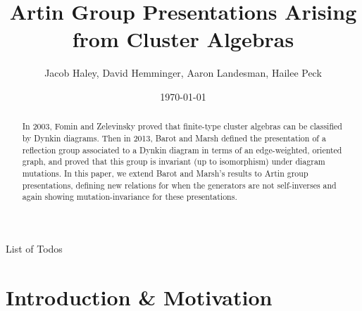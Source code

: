\documentclass[11pt]{amsart}
\makeatletter
\theoremstyle{definition}
\def\listtodoname{List of Todos}
\def\listoftodos{\@starttoc{tdo}\listtodoname}
\makeatother
\begin{document}
\listoftodos




\title{Artin Group Presentations Arising from Cluster Algebras}
\author{Jacob Haley, David Hemminger, Aaron Landesman, Hailee Peck}
\address{you can put addresses for authors\\
here \\
Jacob: 225 St. Edward's Hall; Notre Dame, IN 46556}
\date{\today}

\begin{abstract}
In 2003, Fomin and Zelevinsky proved that finite-type cluster algebras can be classified by Dynkin diagrams. Then in 2013, Barot and Marsh defined the presentation of a reflection group associated to a Dynkin diagram in terms of an edge-weighted, oriented graph, and proved that this group is invariant (up to isomorphism) under diagram mutations. In this paper, we extend Barot and Marsh's results to Artin group presentations, defining new relations for when the generators are not self-inverses and again showing mutation-invariance for these presentations.
\end{abstract}

\maketitle

\section{Introduction \& Motivation}
\label{sec:Intro}
\end{document}
